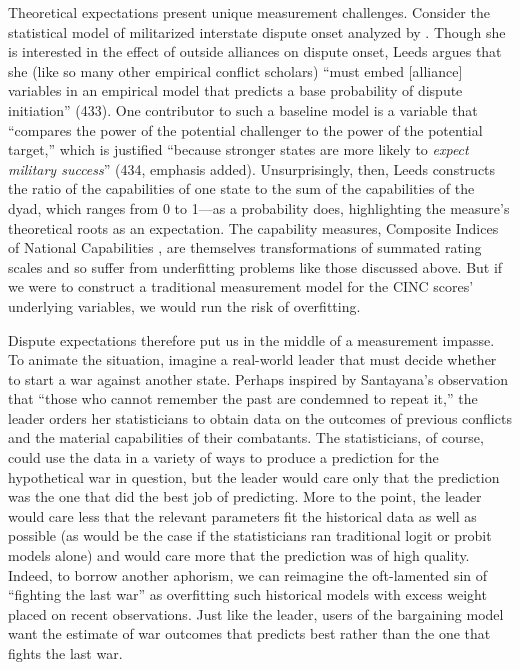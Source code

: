 Theoretical expectations present unique measurement challenges.  Consider the statistical model of militarized interstate dispute onset analyzed by \citet{leeds2003}.  Though she is interested in the effect of outside alliances on dispute onset, Leeds argues that she (like so many other empirical conflict scholars) ``must embed [alliance] variables in an empirical model that predicts a base probability of dispute initiation'' (433).  One contributor to such a baseline model is a variable that ``compares the power of the potential challenger to the power of the potential target,'' which is justified ``because stronger states are more likely to \emph{expect military success}'' (434, emphasis added).  Unsurprisingly, then, Leeds constructs the ratio of the capabilities of one state to the sum of the capabilities of the dyad, which ranges from 0 to 1---as a probability does, highlighting the measure's theoretical roots as an expectation.  The capability measures, Composite Indices of National Capabilities \citep{singer1972}, are themselves transformations of summated rating scales and so suffer from underfitting problems like those discussed above.  But if we were to construct a traditional measurement model for the CINC scores' underlying variables, we would run the risk of overfitting.

Dispute expectations therefore put us in the middle of a measurement impasse.
To animate the situation, imagine a real-world leader that must decide whether to start a war against another state.
Perhaps inspired by Santayana's observation that ``those who cannot remember the past are condemned to repeat it,'' the leader orders her statisticians to obtain data on the outcomes of previous conflicts and the material capabilities of their combatants.
The statisticians, of course, could use the data in a variety of ways to produce a prediction for the hypothetical war in question, but the leader would care only that the prediction was the one that did the best job of predicting.
More to the point, the leader would care less that the relevant parameters fit the historical data as well as possible (as would be the case if the statisticians ran traditional logit or probit models alone) and would care more that the prediction was of high quality.
Indeed, to borrow another aphorism, we can reimagine the oft-lamented sin of ``fighting the last war'' \citep[e.g.][]{hart1972} as overfitting such historical models with excess weight placed on recent observations.
Just like the leader, users of the bargaining model want the estimate of war outcomes that predicts best rather than the one that fights the last war.

